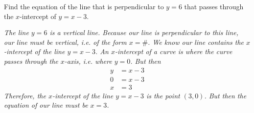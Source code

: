 \documentclass[12pt,letterpaper]{exam}
\begin{document}
\begin{questions}
\newpage



\question[8] Find the equation of the line that is perpendicular to $y= 6$ that passes through the $x$-intercept of $y= x - 3$. \pvspace{1.3cm}

{\itshape The line $y= 6$ is a vertical line. Because our line is perpendicular to this line, our line must be vertical, i.e. of the form $x= \#$. We know our line contains the $x$-intercept of the line $y= x - 3$. An $x$-intercept of a curve is where the curve passes through the $x$-axis, i.e. where $y= 0$. But then
	\[
	\begin{aligned}
	y&= x - 3 \\
	0&= x - 3 \\
	x&= 3
	\end{aligned}
	\]
Therefore, the $x$-intercept of the line $y= x - 3$ is the point $(3, 0)$. But then the equation of our line must be $x= 3$.}


\end{questions}
\end{document}
